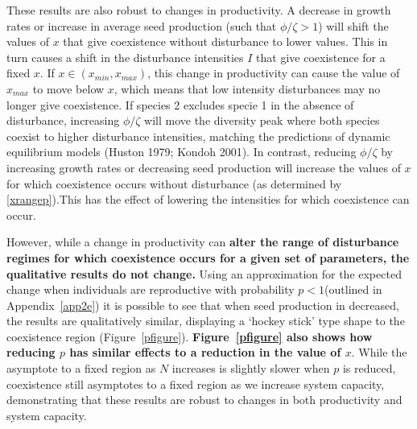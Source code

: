 These results are also robust to changes in productivity. A decrease in growth rates or increase in average seed production (such that $\phi/\zeta>1$) will shift the values of $x$ that give coexistence without disturbance to lower values. This in turn causes a shift in the disturbance intensities $I$ that give coexistence for a fixed $x$. If $x \in (x_{min},x_{max})$, this change in productivity can cause the value of $x_{max}$ to move below $x$, which means that low intensity disturbances may no longer  give coexistence. If species 2 excludes specie 1 in the absence of disturbance, increasing $\phi/ \zeta$ will move the diversity peak where both species coexist to higher disturbance intensities, matching the predictions of dynamic equilibrium models (Huston 1979; Kondoh 2001). In contrast, reducing $\phi/\zeta$ by increasing growth rates or decreasing seed production will increase the values of $x$ for which coexistence occurs without disturbance (as determined by \eqref{xrangep}).This has the effect of lowering the intensities for which coexistence can occur.

However, while a change in productivity can \textbf{alter the range of disturbance regimes for which coexistence occurs for a given set of parameters, the qualitative results do not change.} Using an approximation for the expected change when individuals are reproductive with probability $p<1$(outlined in Appendix~\ref{app2e}) it is possible to see that when seed production in decreased, the results are qualitatively similar, displaying a `hockey stick' type shape to the coexistence region (Figure~\ref{pfigure}). \textbf{Figure~\ref{pfigure} also shows how reducing $p$ has similar effects to a reduction in the value of $x$}. While the asymptote to a fixed region as $N$ increases is slightly slower when $p$ is reduced, coexistence still asymptotes to a fixed region as we increase system capacity, demonstrating that these results are robust to changes in both productivity and system capacity.

